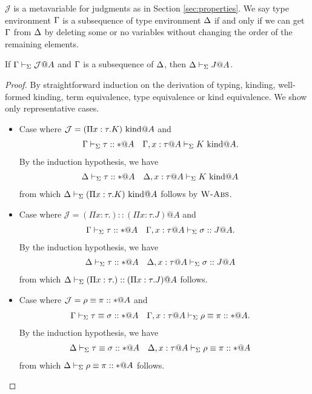 $\mathcal{J}$ is a metavariable for judgments as in Section \ref{sec:properties}.
We say type environment \(\Gamma\) is a subsequence of type environment \(\Delta\)
if and only if we can get \(\Gamma\) from \(\Delta\) by deleting some or no variables without changing the order of the remaining elements.
\begin{lemma}[Weakening]
	If \(\Gamma \vdash_\Sigma \mathcal{J}@A\) and \(\Gamma\) is a subsequence of \(\Delta\), then \(\Delta \vdash_\Sigma J@A\). 
\end{lemma}

\begin{proof}
	By straightforward induction on the derivation of typing, kinding, well-formed kinding,
	term equivalence, type equivalence or kind equivalence.
	We show only representative cases.
	\begin{itemize}
		\item[] Case \WAbs{} where $\mathcal{J} = (\Pi x:\tau.K)\text{\ kind} @A$ and 
		      \begin{align*} 
		      	  & \G \V \tau :: * @ A &   & \G,x:\tau@A \V K \iskind @A. 
		      \end{align*}
		      By the induction hypothesis, we have
		      \begin{align*}
		      	  & \D \V \tau::*@A &   & \D, x:\tau@A \V K \iskind @ A 
		      \end{align*}
		      from which $\Delta\vdash_\Sigma (\Pi x:\tau.K) \text{\ kind} @ A$ follows by $\textsc{W-Abs}$.
		      
		\item[] Case \KAbs{} where $\mathcal{J} = (\Pi x:\tau.) :: (\Pi x:\tau.J)@A$ and 
		      \begin{align*} 
		      	  & \G \V \tau::*@A &   & \G,x:\tau@A\V \sigma :: J @ A. 
		      \end{align*}
		      By the induction hypothesis, we have
		      \begin{align*} 
		      	  & \D \V \tau::*@A &   & \D,x:\tau@A\V \sigma :: J @ A 
		      \end{align*}
		      from which $\Delta \vdash_\Sigma (\Pi x:\tau.) :: (\Pi x:\tau.J)@A$ follows.
		      
		\item[] Case \QTAbs{} where \( \mathcal{J} = \rho \equiv \pi :: * @ A \) and
		      \begin{align*} 
		      	  & \G\V \tau \E \sigma :: *@A &   & \G,x:\tau@A \V \rho \E \pi :: *@A. 
		      \end{align*}
		      By the induction hypothesis, we have
		      \begin{align*} 
		      	  & \D\V \tau \E \sigma :: *@A &   & \D,x:\tau@A \V \rho \E \pi :: *@A 
		      \end{align*}
		      from which \( \Delta\vdash_\Sigma \rho \equiv \pi :: * @ A \) follows.
		      

\end{itemize}
\end{proof}
